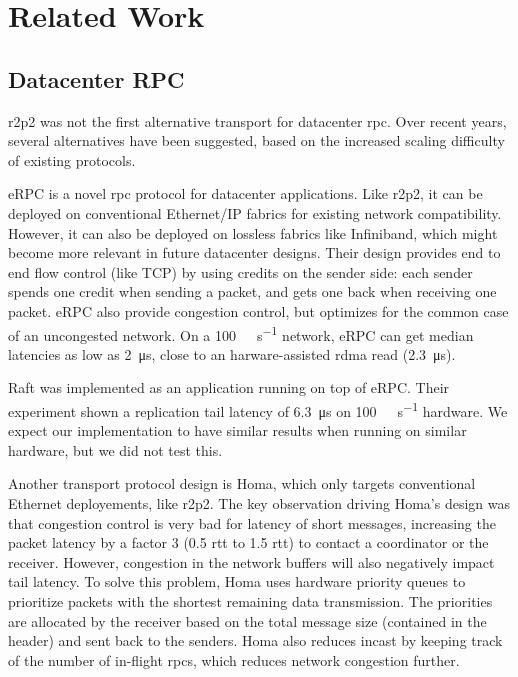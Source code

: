 \chapter{Related Work}\label{chap:related-work}

\section{Datacenter RPC}

\gls{r2p2} was not the first alternative transport for datacenter \gls{rpc}.
Over recent years, several alternatives have been suggested, based on the increased scaling difficulty of existing protocols.

eRPC\cite{erpc} is a novel \gls{rpc} protocol for datacenter applications.
Like \gls{r2p2}, it can be deployed on conventional Ethernet/IP fabrics for existing network compatibility.
However, it can also be deployed on lossless fabrics like Infiniband, which might become more relevant in future datacenter designs.
Their design provides end to end flow control (like TCP) by using credits on the sender side: each sender spends one credit when sending a packet, and gets one back when receiving one packet.
eRPC also provide congestion control, but optimizes for the common case of an uncongested network.
On a \SI{100}{\giga\bit\per\second} network, eRPC can get median latencies as low as \SI{2}{\micro\second}, close to an harware-assisted \gls{rdma} read (\SI{2.3}{\micro\second}).

Raft was implemented as an application running on top of eRPC.
Their experiment shown a replication tail latency of \SI{6.3}{\micro\second} on \SI{100}{\giga\bit\per\second} hardware.
We expect our implementation to have similar results when running on similar hardware, but we did not test this.

Another transport protocol design is Homa\cite{homa}, which only targets conventional Ethernet deployements, like \gls{r2p2}.
The key observation driving Homa's design was that congestion control is very bad for latency of short messages, increasing the packet latency by a factor 3 (0.5 \gls{rtt} to 1.5 \gls{rtt}) to contact a coordinator or the receiver.
However, congestion in the network buffers will also negatively impact tail latency.
To solve this problem, Homa uses hardware priority queues to prioritize packets with the shortest remaining data transmission.
The priorities are allocated by the receiver based on the total message size (contained in the header) and sent back to the senders.
Homa also reduces incast by keeping track of the number of in-flight \glspl{rpc}, which reduces network congestion further.

